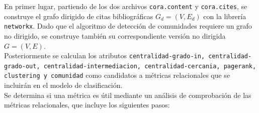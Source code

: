 \documentclass[conference,a4paper]{IEEEtran}
\begin{document}
En primer lugar, partiendo de los dos archivos \texttt{cora.content}  y \texttt{cora.cites}, se construye el grafo dirigido de citas bibliográficas
$G_d = (V, E_d)$ con la librería \texttt{networkx}. Dado que el algoritmo de detección de comunidades requiere un grafo no dirigido, se construye también su 
correspondiente versión no dirigida $G = (V, E)$.
\\
Posteriormente se calculan los atributos \texttt{centralidad-grado-in, centralidad-grado-out, centralidad-intermediacion, centralidad-cercania, pagerank, clustering y comunidad}
como candidatos a métricas relacionales que se incluirán en el modelo de clasificación.
\\
Se determina si una métrica es útil mediante un análisis de comprobación de las métricas relacionales, que incluye los siguientes pasos:
\end{document}
